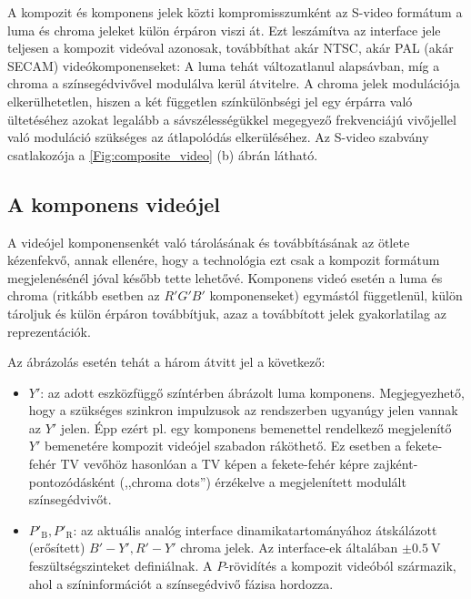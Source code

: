 A kompozit és komponens jelek közti kompromisszumként az S-video formátum a luma és chroma jeleket külön érpáron viszi át.
Ezt leszámítva az interface jele teljesen a kompozit videóval azonosak, továbbíthat akár NTSC, akár PAL (akár SECAM) videókomponenseket:
A luma tehát változatlanul alapsávban, míg a chroma a színsegédvivővel modulálva kerül átvitelre.
A chroma jelek modulációja elkerülhetetlen, hiszen a két független színkülönbségi jel egy érpárra való ültetéséhez azokat legalább a sávszélességükkel megegyező frekvenciájú vivőjellel való moduláció szükséges az átlapolódás elkerüléséhez.
Az S-video szabvány csatlakozója a \ref{Fig:composite_video} (b) ábrán látható.


\subsection{A komponens videójel}

A videójel komponensenkét való tárolásának és továbbításának az ötlete kézenfekvő, annak ellenére, hogy a technológia ezt csak a kompozit formátum megjelenésénél jóval később tette lehetővé.
Komponens videó esetén a luma és chroma (ritkább esetben az $R'G'B'$ komponenseket) egymástól függetlenül, külön tároljuk és külön érpáron továbbítjuk, azaz a továbbított jelek gyakorlatilag az \ypbpr reprezentációk.

Az \ypbpr  ábrázolás esetén tehát a három átvitt jel a következő:
\begin{itemize}
\item $Y'$: az adott eszközfüggő színtérben ábrázolt luma komponens.
Megjegyezhető, hogy a szükséges szinkron impulzusok az \ypbpr rendszerben ugyanúgy jelen vannak az $Y'$ jelen.
Épp ezért pl. egy \ypbpr komponens bemenettel rendelkező megjelenítő $Y'$ bemenetére kompozit videójel szabadon ráköthető.
Ez esetben a fekete-fehér TV vevőhöz hasonlóan a TV képen a fekete-fehér képre zajként-pontozódásként (,,chroma dots'') érzékelve a megjelenített modulált színsegédvivőt.
\item $P'_{\mathrm{B}},P'_{\mathrm{R}}$: az aktuális analóg interface dinamikatartományához átskálázott (erősített) $B'-Y', R'-Y'$ chroma jelek.
Az interface-ek általában $\pm 0.5~\mathrm{V}$ feszültségszinteket definiálnak.
A $P$-rövidítés a kompozit videóból származik, ahol a színinformációt a színsegédvivő fázisa hordozza.
\end{itemize}

